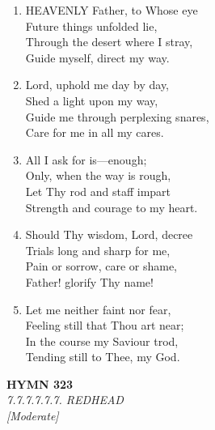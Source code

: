 \documentclass[11pt,a4paper]{article}
\begin{document}
\begin{enumerate}
    \item HEAVENLY Father, to Whose eye \\
        Future things unfolded lie, \\
        Through the desert where I stray, \\
        Guide myself, direct my way.

    \item Lord, uphold me day by day, \\
        Shed a light upon my way, \\
        Guide me through perplexing snares, \\
        Care for me in all my cares.

    \item All I ask for is---enough; \\
        Only, when the way is rough, \\
        Let Thy rod and staff impart \\
        Strength and courage to my heart.

    \item Should Thy wisdom, Lord, decree \\
        Trials long and sharp for me, \\
        Pain or sorrow, care or shame, \\
        Father! glorify Thy name!

    \item Let me neither faint nor fear, \\
        Feeling still that Thou art near; \\
        In the course my Saviour trod, \\
        Tending still to Thee, my God.

\end{enumerate}

\newpage
\begin{center}
    {\Large \textbf{HYMN 323}}
    \\
    \textit{7.7.7.7.7.7. REDHEAD}
    \\
    \textit{\small [Moderate]}
\end{center}
\vspace{1em}
\end{document}

